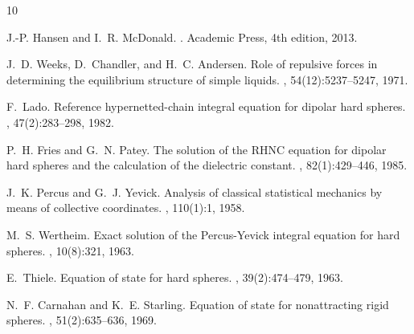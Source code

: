 \documentclass[11pt,a4paper]{article}
\begin{document}

\begin{thebibliography}{10}

J.-P. Hansen and I.~R. McDonald.
.
\newblock Academic Press, 4th edition, 2013.

J.~D. Weeks, D.~Chandler, and H.~C. Andersen.
\newblock Role of repulsive forces in determining the equilibrium structure of simple liquids.
, 54(12):5237--5247, 1971.

F.~Lado.
\newblock Reference hypernetted-chain integral equation for dipolar hard spheres.
, 47(2):283--298, 1982.

P.~H. Fries and G.~N. Patey.
\newblock The solution of the {RHNC} equation for dipolar hard spheres and the calculation of the dielectric constant.
, 82(1):429--446, 1985.

J.~K. Percus and G.~J. Yevick.
\newblock Analysis of classical statistical mechanics by means of collective coordinates.
, 110(1):1, 1958.

M.~S. Wertheim.
\newblock Exact solution of the {Percus-Yevick} integral equation for hard spheres.
, 10(8):321, 1963.

E.~Thiele.
\newblock Equation of state for hard spheres.
, 39(2):474--479, 1963.

N.~F. Carnahan and K.~E. Starling.
\newblock Equation of state for nonattracting rigid spheres.
, 51(2):635--636, 1969.

\end{thebibliography}
\end{document}
